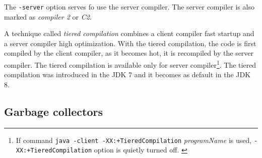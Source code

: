 \documentclass[
  digital, %
  oneside,
  notable, %
  nolof,     %
  nolot     %
]{fithesis3}
\begin{document}
The \texttt{-server} option serves fo use the server compiler. The server compiler is also marked as \textit{compiler 2} or \textit{C2}.

A technique called \textit{tiered compilation} combines a client compiler fast startup and a server compiler high optimization. With the tiered compilation, the code is first compiled by the client compiler, as it becomes hot, it is recompiled by the server compiler. The tiered compilation is available only for server compiler\footnote{If command \texttt{java -client -XX:+TieredCompilation}\textit{ programName} is used, \texttt{-XX:+TieredCompilation} option is quietly turned off. \cite{scott}}. The tiered compilation was introduced in the JDK 7 and it becomes as default in the JDK 8. \cite{scott}
\subsection{Garbage collectors}
\end{document}
